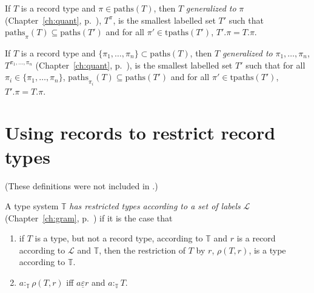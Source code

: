 If $T$ is a record type and $\pi\in\mathrm{paths}(T)$, then $T$
\textit{generalized to} $\pi$ (Chapter~\ref{ch:quant}, p.~\pageref{ex:rectype-gen}), $T^\pi$, is the smallest labelled set $T'$ such
that $\mathrm{paths}_\pi(T)\subseteq\mathrm{paths}(T')$ and for all
$\pi'\in\mathrm{tpaths}(T')$, $T'.\pi=T.\pi$.

If $T$ is a record type and $\{\pi_1,\ldots,\pi_n\}\subset\mathrm{paths}(T)$, then $T$
\textit{generalized to} $\pi_1,\ldots,\pi_n$, $T^{\pi_1,\ldots,\pi_n}$
(Chapter~\ref{ch:quant}, p.~\pageref{ex:rectype-gen-gen}), is the smallest labelled set $T'$ such
that for all $\pi_i\in\{\pi_1,\ldots,\pi_n\}$, $\mathrm{paths}_{\pi_i}(T)\subseteq\mathrm{paths}(T')$ and for all
$\pi'\in\mathrm{tpaths}(T')$, $T'.\pi=T.\pi$.



\section{Using records to restrict %
  record types}
\label{app:specrec}

(These definitions were not included in \citealp{Cooper2012}.)


 
 
 

A type system $\mathbb{T}$ \textit{has restricted types according to a
  set of labels} $\mathcal{L}$ (Chapter~\ref{ch:gram},
p.~\pageref{pg:typerestriction}) if it is the case that
\begin{enumerate} 
 
\item   if  $T$ is a type, but not a record type, according to $\mathbb{T}$ and
  $r$ is a record according to $\mathcal{L}$ and $\mathbb{T}$, then the
  restriction of $T$ by $r$, $\rho(T, r)$, is a
  type according to $\mathbb{T}$.
  
 
\item $a:_{\mathbb{T}}\rho(T,r)$ iff $a\underline{\varepsilon} r$  and
  $a:_{\mathbb{T}}T$.

\end{enumerate}


